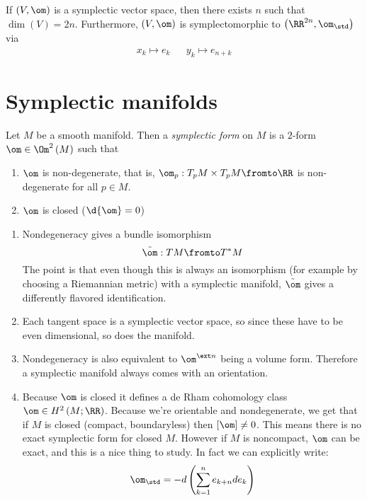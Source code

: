 \documentclass{amsart}
\begin{document}
\begin{cor}
If $\left( V , \om \right)$ is a symplectic vector space, then
there exists $n$ such that
$\dim\left( V \right)= 2n$.
Furthermore, $\left( V , \om \right)$ is symplectomorphic to 
$\left( \RR^{2n} , \om_{\std} \right)$ via
\begin{align}
x_k\mapsto e_k
&&
y_k \mapsto e_{n + k}
\end{align}
\end{cor}

\section{Symplectic manifolds}

\begin{defn}
Let $M$ be a smooth manifold. Then a \emph{symplectic form} on $M$ is a 
$2$-form $\om\in \Om^2\left( M \right)$ such that
\begin{enumerate}
\item $\om$ is non-degenerate, that is, 
$\om_p: T_p M \times T_p M \fromto \RR$
is non-degenerate for all $p\in M$.
\item $\om$ is closed ($\d{\om} = 0$)
\end{enumerate}
\end{defn}

\begin{rmk}
\begin{enumerate}
\item Nondegeneracy gives a bundle isomorphism
\begin{equation}
\tilde \om : TM \fromto T^*M
\end{equation}
The point is that even though this is always an isomorphism (for example by choosing
a Riemannian metric) with a symplectic manifold, $\tilde \om$ gives a differently 
flavored identification.
\item Each tangent space is a symplectic vector space, so since these have to be 
even dimensional, so does the manifold.
\item Nondegeneracy is also equivalent to $\om^{\ext n}$ being a volume form.
Therefore a symplectic manifold always comes with an orientation.
\item Because $\om$ is closed it defines a de Rham cohomology class
$\om \in H^2\left( M ; \RR \right)$. 
Because we're orientable and nondegenerate, we get that if $M$ is closed (compact, 
boundaryless) then $\left[ \om \right] \neq 0$.
This means there is no exact symplectic form for closed $M$. 
However if $M$ is noncompact, $\om$ can be exact, and this is a nice thing to study. 
In fact we can explicitly write:
\begin{equation}
\om_\std = 
-d \left( \sum_{k = 1}^n e_{k + n} d e_{k} \right)
\end{equation}
\end{enumerate}
\end{rmk}
\end{document}
